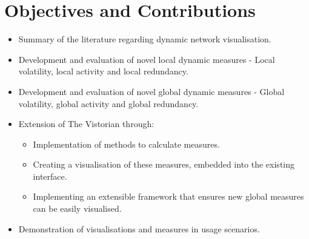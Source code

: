 \section{Objectives and Contributions}
\label{objectives}
\begin{itemize}
    \item Summary of the literature regarding dynamic network visualisation.
    \item Development and evaluation of novel local dynamic measures - Local volatility, local activity and local redundancy.
    \item Development and evaluation of novel global dynamic measures - Global volatility, global activity and global redundancy.
    \item Extension of The Vistorian through:
    \begin{itemize}
        \item Implementation of methods to calculate measures.
        \item Creating a visualisation of these measures, embedded into the existing interface.
        \item Implementing an extensible framework that ensures new global measures can be easily visualised.
    \end{itemize}
    \item Demonstration of visualisations and measures in usage scenarios.


\end{itemize}






